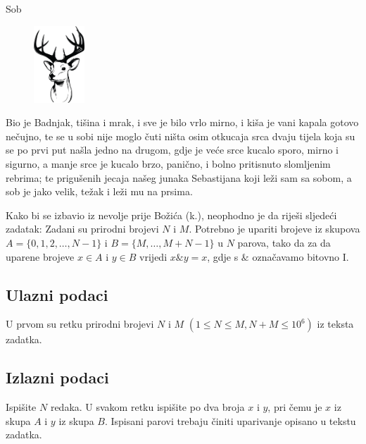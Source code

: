 \begin{statement}[
  problempoints=110,
  timelimit=1 sekunda,
  memorylimit=512 MiB,
]{Sob}

\setlength\intextsep{-0.1cm}
\begin{figure}
\centering
\includegraphics[width=0.17\textwidth]{img/sob.png}
\end{figure}

Bio je Badnjak, tišina i mrak, i sve je bilo vrlo mirno, i kiša je vani kapala
gotovo nečujno, te se u sobi nije moglo čuti ništa osim otkucaja srca dvaju
tijela koja su se po prvi put našla jedno na drugom, gdje je veće srce kucalo
sporo, mirno i sigurno, a manje srce je kucalo brzo, panično, i bolno
pritisnuto slomljenim rebrima; te prigušenih jecaja našeg junaka
Sebastijana koji leži sam sa sobom, a sob je jako velik, težak i leži mu na
prsima.

Kako bi se izbavio iz nevolje prije Božića (k.), neophodno je da riješi
sljedeći zadatak: Zadani su prirodni brojevi $N$ i $M$. Potrebno je upariti
brojeve iz skupova $A = \{ 0, 1, 2, \dots, N - 1 \}$ i $B = \{ M, \dots, M + N - 1
\}$ u $N$ parova, tako da za da uparene brojeve $x \in A$ i $y \in B$ vrijedi
$x \mathbin{\&} y = x$, gdje s $\&$ označavamo bitovno I.

\subsection*{Ulazni podaci}
U prvom su retku prirodni brojevi $N$ i $M$ $(1 \le N \le M, N + M \le 10^6)$
iz teksta zadatka.

\subsection*{Izlazni podaci}
Ispišite $N$ redaka. U svakom retku ispišite po dva broja $x$ i $y$, pri čemu je
$x$ iz skupa $A$ i $y$ iz skupa $B$. Ispisani parovi trebaju činiti uparivanje
opisano u tekstu zadatka.


\end{statement}
